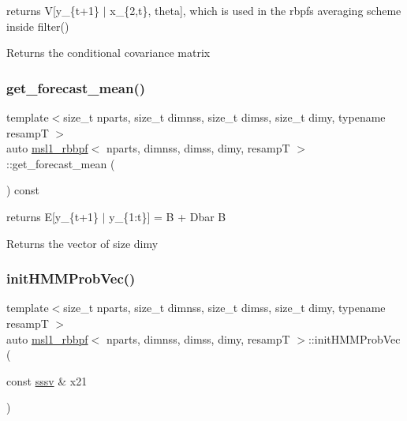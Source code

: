 returns V\mbox{[}y\+\_\+\{t+1\} $\vert$ x\+\_\+\{2,t\}, theta\mbox{]}, which is used in the rbpf\textquotesingle{}s averaging scheme inside filter() 

\begin{DoxyReturn}{Returns}
the conditional covariance matrix 
\end{DoxyReturn}
\mbox{\label{classmsl1__rbbpf_af17379667c366be4faaf0241b64d00e6}} 
\subsubsection{\texorpdfstring{get\+\_\+forecast\+\_\+mean()}{get\_forecast\_mean()}}
{\footnotesize\ttfamily template$<$size\+\_\+t nparts, size\+\_\+t dimnss, size\+\_\+t dimss, size\+\_\+t dimy, typename resampT $>$ \\
auto \hyperlink{classmsl1__rbbpf}{msl1\+\_\+rbbpf}$<$ nparts, dimnss, dimss, dimy, resampT $>$\+::get\+\_\+forecast\+\_\+mean (\begin{DoxyParamCaption}{ }\end{DoxyParamCaption}) const}



returns E\mbox{[}y\+\_\+\{t+1\} $\vert$ y\+\_\+\{1\+:t\}\mbox{]} =  B +  Dbar B 

\begin{DoxyReturn}{Returns}
the vector of size dimy 
\end{DoxyReturn}
\mbox{\label{classmsl1__rbbpf_a3555cc4b6c307e4e8d2300c0514ce5dd}} 
\subsubsection{\texorpdfstring{init\+H\+M\+M\+Prob\+Vec()}{initHMMProbVec()}}
{\footnotesize\ttfamily template$<$size\+\_\+t nparts, size\+\_\+t dimnss, size\+\_\+t dimss, size\+\_\+t dimy, typename resampT $>$ \\
auto \hyperlink{classmsl1__rbbpf}{msl1\+\_\+rbbpf}$<$ nparts, dimnss, dimss, dimy, resampT $>$\+::init\+H\+M\+M\+Prob\+Vec (\begin{DoxyParamCaption}\item[{const \hyperlink{classmsl1__rbbpf_a6703c548bb85bbe8e5a6baa723e8f0bb}{sssv} \&}]{x21 }\end{DoxyParamCaption})}




